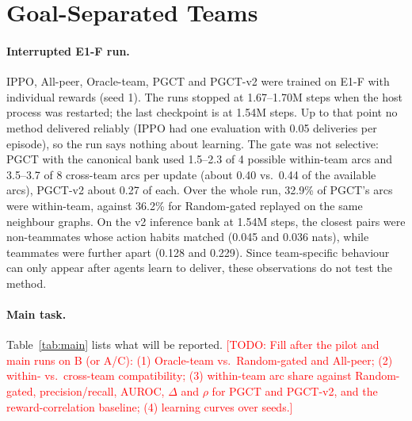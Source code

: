 \documentclass{article}
\theoremstyle{remark}
\newcommand{\todo}[1]{\textcolor{red}{[TODO: #1]}}
\newcommand{\ours}{PGCT}
\begin{document}
\section{Goal-Separated Teams}
\label{sec:main}
\paragraph{Interrupted E1-F run.} IPPO, All-peer, Oracle-team, \ours{} and \ours{}-v2 were trained on E1-F with individual
rewards (seed 1).
The runs stopped at 1.67--1.70M steps when the host process was restarted; the last checkpoint is at 1.54M steps. Up to that
point no method delivered reliably (IPPO had one evaluation with 0.05 deliveries per episode), so the run says nothing about
learning. The gate was not selective: \ours{} with the canonical bank used 1.5--2.3 of 4 possible within-team arcs and
3.5--3.7 of 8 cross-team arcs per update (about 0.40 vs.\ 0.44 of the available arcs), \ours{}-v2 about 0.27 of each. Over the
whole run, 32.9\% of \ours{}'s arcs were within-team, against 36.2\% for Random-gated replayed on the same neighbour graphs. On
the v2 inference bank at 1.54M steps, the closest pairs were non-teammates whose action habits matched (0.045 and 0.036 nats),
while teammates were further apart (0.128 and 0.229). Since team-specific behaviour can only appear after agents learn to
deliver, these observations do not test the method.

\paragraph{Main task.} Table~\ref{tab:main} lists what will be reported. \todo{Fill after the pilot and main runs on B (or A/C): (1) Oracle-team vs.\ Random-gated and All-peer;
(2) within- vs.\ cross-team compatibility; (3) within-team arc share against Random-gated, precision/recall, AUROC, $\Delta$
and $\rho$ for \ours{} and \ours{}-v2, and the reward-correlation baseline; (4) learning curves over seeds.}
\end{document}
